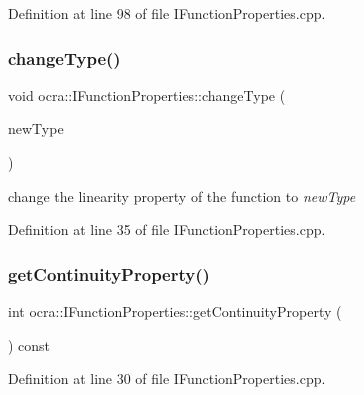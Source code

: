 Definition at line 98 of file I\+Function\+Properties.\+cpp.

\hypertarget{classocra_1_1IFunctionProperties_a49eb26106db8a6db9f3fbe87a641f433}{}\label{classocra_1_1IFunctionProperties_a49eb26106db8a6db9f3fbe87a641f433} 
\subsubsection{\texorpdfstring{change\+Type()}{changeType()}}
{\footnotesize\ttfamily void ocra\+::\+I\+Function\+Properties\+::change\+Type (\begin{DoxyParamCaption}\item[{\hyperlink{namespaceocra_a87b525b5508b0f6e9d931f14c7c226ab}{e\+Function\+Linearity}}]{new\+Type }\end{DoxyParamCaption})\hspace{0.3cm}{\ttfamily [protected]}}

change the linearity property of the function to {\itshape new\+Type} 

Definition at line 35 of file I\+Function\+Properties.\+cpp.

\hypertarget{classocra_1_1IFunctionProperties_a2b999c6d608ee84135d7daf56a86420f}{}\label{classocra_1_1IFunctionProperties_a2b999c6d608ee84135d7daf56a86420f} 
\subsubsection{\texorpdfstring{get\+Continuity\+Property()}{getContinuityProperty()}}
{\footnotesize\ttfamily int ocra\+::\+I\+Function\+Properties\+::get\+Continuity\+Property (\begin{DoxyParamCaption}\item[{void}]{ }\end{DoxyParamCaption}) const}



Definition at line 30 of file I\+Function\+Properties.\+cpp.

\hypertarget{classocra_1_1IFunctionProperties_a53e39be08b8883d55193c87168743e3e}{}\label{classocra_1_1IFunctionProperties_a53e39be08b8883d55193c87168743e3e} 
